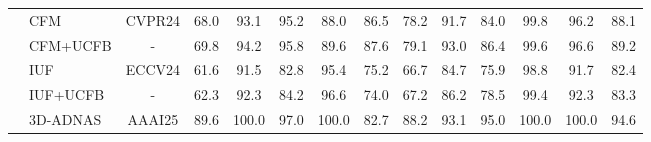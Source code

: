 \begin{table}[t!]
\begin{center}
{\begin{tabular}{c|l|c|c ccc ccc ccc |c}
\arrayrulecolor{lightgray}\cmidrule{2-14}\arrayrulecolor{black}
&\cellcolor{mycolor1_1}CFM &\cellcolor{mycolor1_1}CVPR24 &\cellcolor{mycolor1_1}68.0 & \cellcolor{mycolor1_1}93.1 & \cellcolor{mycolor1_1}95.2 & \cellcolor{mycolor1_1}88.0 &\cellcolor{mycolor1_1}86.5  &\cellcolor{mycolor1_1}78.2 &\cellcolor{mycolor1_1}91.7 &\cellcolor{mycolor1_1}84.0 &\cellcolor{mycolor1_1}99.8 &\cellcolor{mycolor1_1}96.2&\cellcolor{mycolor1_1}88.1\\
&\cellcolor{mycolor1_2}CFM+UCFB &\cellcolor{mycolor1_2} - & \cellcolor{mycolor1_2}69.8 & \cellcolor{mycolor1_2}94.2 &\cellcolor{mycolor1_2} 95.8&\cellcolor{mycolor1_2} 89.6&\cellcolor{mycolor1_2} 87.6&\cellcolor{mycolor1_2}79.1&\cellcolor{mycolor1_2} 93.0&\cellcolor{mycolor1_2} 86.4&\cellcolor{mycolor1_2} 99.6&\cellcolor{mycolor1_2}96.6 &\cellcolor{mycolor1_2}89.2\\
\arrayrulecolor{lightgray}\cmidrule{2-14}\arrayrulecolor{black}
& \cellcolor{mycolor1_1}IUF &\cellcolor{mycolor1_1} ECCV24 &\cellcolor{mycolor1_1} 61.6 &\cellcolor{mycolor1_1} 91.5 &\cellcolor{mycolor1_1} 82.8&\cellcolor{mycolor1_1} 95.4&\cellcolor{mycolor1_1} 75.2&\cellcolor{mycolor1_1} 66.7&\cellcolor{mycolor1_1} 84.7&\cellcolor{mycolor1_1}75.9&\cellcolor{mycolor1_1} 98.8&\cellcolor{mycolor1_1} 91.7&\cellcolor{mycolor1_1} 82.4\\
&\cellcolor{mycolor1_2}IUF+UCFB &\cellcolor{mycolor1_2} - & \cellcolor{mycolor1_2}62.3 & \cellcolor{mycolor1_2}92.3 &\cellcolor{mycolor1_2} 84.2&\cellcolor{mycolor1_2} 96.6&\cellcolor{mycolor1_2} 74.0&\cellcolor{mycolor1_2}67.2&\cellcolor{mycolor1_2} 86.2&\cellcolor{mycolor1_2} 78.5&\cellcolor{mycolor1_2} 99.4&\cellcolor{mycolor1_2}92.3 &\cellcolor{mycolor1_2}83.3\\
\arrayrulecolor{lightgray}\cmidrule{2-14}\arrayrulecolor{black}
& \cellcolor{mycolor1_1}3D-ADNAS & \cellcolor{mycolor1_1}AAAI25 &\cellcolor{mycolor1_1} 89.6 & \cellcolor{mycolor1_1}100.0 & \cellcolor{mycolor1_1}97.0& \cellcolor{mycolor1_1}100.0& \cellcolor{mycolor1_1}82.7& \cellcolor{mycolor1_1}88.2& \cellcolor{mycolor1_1}93.1&\cellcolor{mycolor1_1}95.0& \cellcolor{mycolor1_1}100.0& \cellcolor{mycolor1_1}100.0& \cellcolor{mycolor1_1}94.6\\

\end{tabular}}
\end{center}
\end{table}
